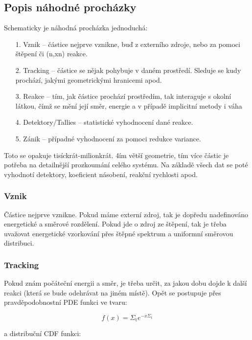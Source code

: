 \subsection{Popis náhodné procházky}

Schematicky je náhodná procházka jednoduchá:

\begin{enumerate}
  \item[1.] Vznik -- částice nejprve vznikne, buď z externího zdroje, nebo za pomoci štěpení či (n,xn) reakce.
  \item[2.] Tracking -- částice se nějak pohybuje v daném prostředí. Sleduje se kudy prochází, jakými geometrickými hranicemi apod.
  \item[3.] Reakce -- tím, jak částice prochází prostředím, tak interaguje s okolní látkou, čímž se mění její směr, energie a v případě implicitní metody i váha
  \item[4.] Detektory/Tallies -- statistické vyhodnocení dané reakce.
  \item[5.] Zánik -- případné vyhodnocení za pomoci redukce variance.
\end{enumerate}

Toto se opakuje tisíckrát-milionkrát. 4ím větší geometrie, tím více částic je potřeba na detailnější prozkoumání celého systému. Na základě všech dat se poté vyhodnotí detektory, koeficient násobení, reakční rychlosti apod.

\subsubsection{Vznik}

Částice nejprve vznikne. Pokud máme externí zdroj, tak je dopředu nadefinováno energetické a směrové rozdělení. Pokud jde o zdroj ze štěpení, tak je třeba uvažovat energetické vzorkování přes štěpné spektrum a uniformní směrovou distribuci.

\subsubsection{Tracking}

Pokud znám počáteční energii a směr, je třeba určit, za jakou dobu dojde k další reakci (která se bude odehrávat na jiném místě). Opět se postupuje přes pravděpodobnostní PDE funkci ve tvaru:

$$ f(x) = \Sigma_\text{t} e^{-x \Sigma_\text{t}} $$

a distribuční CDF funkci:

